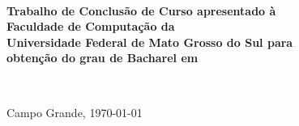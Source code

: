 \vspace*{3.0cm}

\normalsize

\begin{center}

{\Large

\textsc{\titulo}

}

\vspace*{1.0cm}

\autorA \\ 


\vspace*{3.0cm}

{\large

\textbf{Trabalho de Conclusão de Curso apresentado à} \\
\textbf{Faculdade de Computação da} \\
\textbf{Universidade Federal de Mato Grosso do Sul para} \\
\textbf{obtenção do grau de Bacharel em \curso}

}

\vspace{3.0cm}

\orient\\
\corient

\vspace{3.0cm}

Campo Grande, \today

\end{center}

\newpage
